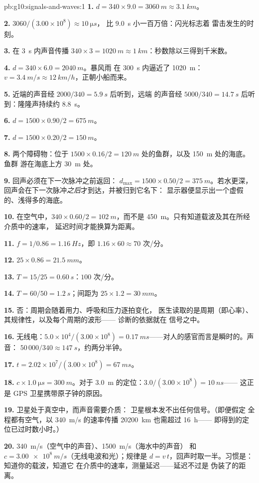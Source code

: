 \begin{solution}{pb:g10:signals-and-waves:1}
\textbf{1.} $d = 340 \times 9.0 = \qty{3060}{m} \approx \qty{3.1}{km}$。

\textbf{2.} $3060/(3.00\times10^{8}) \approx \qty{10}{\micro s}$，
比 \qty{9.0}{s} 小一百万倍：闪光标志着
雷击发生的时刻。

\textbf{3.} 在 \qty{3}{s} 内声音传播 $340 \times 3 = \qty{1020}{m}
\approx \qty{1}{km}$：秒数除以三得到千米数。

\textbf{4.} $d = 340 \times 6.0 = \qty{2040}{m}$。暴风雨
在 \qty{300}{s} 内逼近了 \qty{1020}{m}：$v = \qty{3.4}{m/s} \approx
\qty{12}{km/h}$，正朝小船而来。

\textbf{5.} 近端的声音经 $2000/340 = \qty{5.9}{s}$ 后听到，远端
的声音经 $5000/340 = \qty{14.7}{s}$ 后听到：隆隆声持续约
\qty{8.8}{s}。

\textbf{6.} $d = 1500 \times 0.90/2 = \qty{675}{m}$。

\textbf{7.} $d = 1500 \times 0.20/2 = \qty{150}{m}$。

\textbf{8.} 两个障碍物：位于 $1500 \times 0.16/2 =
\qty{120}{m}$ 处的鱼群，以及 \qty{150}{m} 处的海底。鱼群
游在海底上方 \qty{30}{m} 处。

\textbf{9.} 回声必须在下一次脉冲之前返回：
$d_{\max} = 1500 \times 0.50/2 = \qty{375}{m}$。若水更深，
回声会在下一次脉冲\emph{之后}才到达，并被归到它名下：
显示器便显示出一个虚假的、浅得多的海底。

\textbf{10.} 在空气中，$340 \times 0.60/2 = \qty{102}{m}$，而不是
\qty{450}{m}。只有知道载波及其在所经介质中的速率，
延迟时间才能换算为距离。

\textbf{11.} $f = 1/0.86 = \qty{1.16}{Hz}$，即 $1.16 \times 60
\approx 70$ 次/分。

\textbf{12.} $25 \times 0.86 = \qty{21.5}{mm}$。

\textbf{13.} $T = 15/25 = \qty{0.60}{s}$：$100$ 次/分。

\textbf{14.} $T = 60/50 = \qty{1.2}{s}$；间距为
$25 \times 1.2 = \qty{30}{mm}$。

\textbf{15.} 否：周期会随着用力、呼吸和压力逐拍变化，
医生读取的是周期（即心率）、其规律性，以及每个周期的波形——
诊断的依据就在
信号之中。

\textbf{16.} 无线电：$5.0\times10^{4}/(3.00\times10^{8}) =
\qty{0.17}{ms}$——对人的感官而言是瞬时的。声音：
$50\,000/340 \approx \qty{147}{s}$，约两分半钟。

\textbf{17.} $t = 2.02\times10^{7}/(3.00\times10^{8}) = \qty{67}{ms}$。

\textbf{18.} $c \times \qty{1.0}{\micro s} = \qty{300}{m}$。对于
\qty{3.0}{m} 的定位：$3.0/(3.00\times10^{8}) = \qty{10}{ns}$——
这正是 GPS 卫星携带原子钟的原因。

\textbf{19.} 卫星处于真空中，而声音需要介质：
卫星根本发不出任何信号。（即便假定
全程都有空气，以 \qty{340}{m/s} 的速率传播 \qty{20200}{km} 也需超过 \qty{16}{h}——
即得到的定位已过时数小时。）

\textbf{20.} \qty{340}{m/s}（空气中的声音）、\qty{1500}{m/s}（海水中的声音）
和 $c = \qty{3.00e8}{m/s}$（无线电波和光）；规律是
$d = v\,t$，回声时取一半。习惯是：知道你的载波，知道它
在介质中的速率，测量延迟——延迟不过是
伪装了的距离。
\end{solution}

